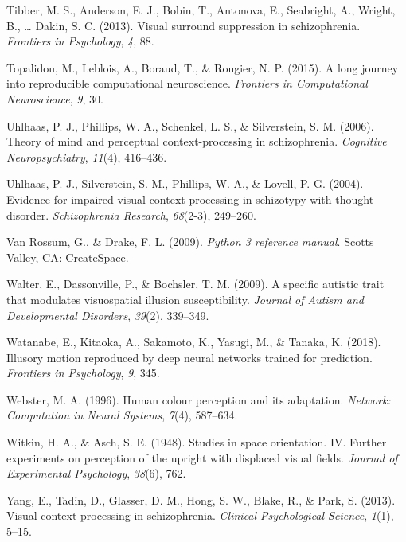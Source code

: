 \documentclass[
  english,
  man,floatsintext]{apa6}
\newlength{\cslhangindent}
\newenvironment{cslreferences}%
  {\setlength{\parindent}{0pt}%
  \everypar{\setlength{\hangindent}{\cslhangindent}}\ignorespaces}%
  {\par}
\begin{document}
\begin{cslreferences}
\leavevmode\hypertarget{ref-tibber2013visual}{}%
Tibber, M. S., Anderson, E. J., Bobin, T., Antonova, E., Seabright, A., Wright, B., \ldots{} Dakin, S. C. (2013). Visual surround suppression in schizophrenia. \emph{Frontiers in Psychology}, \emph{4}, 88.

\leavevmode\hypertarget{ref-topalidou2015long}{}%
Topalidou, M., Leblois, A., Boraud, T., \& Rougier, N. P. (2015). A long journey into reproducible computational neuroscience. \emph{Frontiers in Computational Neuroscience}, \emph{9}, 30.

\leavevmode\hypertarget{ref-uhlhaas2006theory}{}%
Uhlhaas, P. J., Phillips, W. A., Schenkel, L. S., \& Silverstein, S. M. (2006). Theory of mind and perceptual context-processing in schizophrenia. \emph{Cognitive Neuropsychiatry}, \emph{11}(4), 416--436.

\leavevmode\hypertarget{ref-uhlhaas2004evidence}{}%
Uhlhaas, P. J., Silverstein, S. M., Phillips, W. A., \& Lovell, P. G. (2004). Evidence for impaired visual context processing in schizotypy with thought disorder. \emph{Schizophrenia Research}, \emph{68}(2-3), 249--260.

\leavevmode\hypertarget{ref-python3}{}%
Van Rossum, G., \& Drake, F. L. (2009). \emph{Python 3 reference manual}. Scotts Valley, CA: CreateSpace.

\leavevmode\hypertarget{ref-walter2009specific}{}%
Walter, E., Dassonville, P., \& Bochsler, T. M. (2009). A specific autistic trait that modulates visuospatial illusion susceptibility. \emph{Journal of Autism and Developmental Disorders}, \emph{39}(2), 339--349.

\leavevmode\hypertarget{ref-watanabe2018illusory}{}%
Watanabe, E., Kitaoka, A., Sakamoto, K., Yasugi, M., \& Tanaka, K. (2018). Illusory motion reproduced by deep neural networks trained for prediction. \emph{Frontiers in Psychology}, \emph{9}, 345.

\leavevmode\hypertarget{ref-webster1996human}{}%
Webster, M. A. (1996). Human colour perception and its adaptation. \emph{Network: Computation in Neural Systems}, \emph{7}(4), 587--634.

\leavevmode\hypertarget{ref-witkin1948studies}{}%
Witkin, H. A., \& Asch, S. E. (1948). Studies in space orientation. IV. Further experiments on perception of the upright with displaced visual fields. \emph{Journal of Experimental Psychology}, \emph{38}(6), 762.

\leavevmode\hypertarget{ref-yang2013visual}{}%
Yang, E., Tadin, D., Glasser, D. M., Hong, S. W., Blake, R., \& Park, S. (2013). Visual context processing in schizophrenia. \emph{Clinical Psychological Science}, \emph{1}(1), 5--15.
\end{cslreferences}

\endgroup
\end{document}

